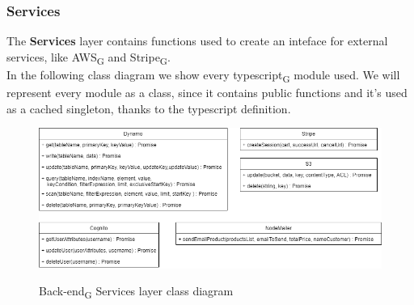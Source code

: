 \subsubsection{Services}
The \textbf{Services} layer contains functions used to create an inteface for external services, like AWS\textsubscript{G} and Stripe\textsubscript{G}.\\
In the following class diagram we show every typescript\textsubscript{G} module used. We will represent every module as a class, since it contains public functions and it's used as a cached singleton, thanks to the typescript definition.

\begin{figure}[H]
\centering
\includegraphics[scale=0.60]{res/Architettura/Backend/img/services_class}\\
\caption{Back-end\textsubscript{G} Services layer class diagram}
\end{figure}


